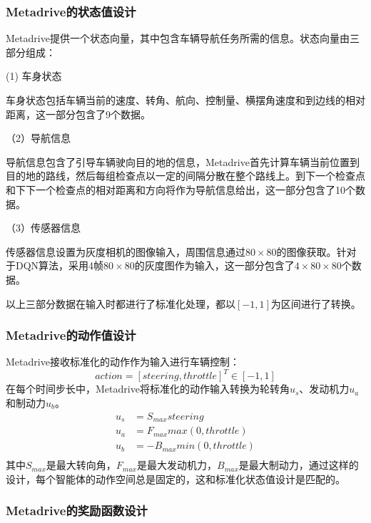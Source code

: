 \subsubsection{Metadrive的状态值设计}

Metadrive提供一个状态向量，其中包含车辆导航任务所需的信息。状态向量由三部分组成：

(1) 车身状态

车身状态包括车辆当前的速度、转角、航向、控制量、横摆角速度和到边线的相对距离，这一部分包含了9个数据。

（2）导航信息

导航信息包含了引导车辆驶向目的地的信息，Metadrive首先计算车辆当前位置到目的地的路线，然后每组检查点以一定的间隔分散在整个路线上。到下一个检查点和下下一个检查点的相对距离和方向将作为导航信息给出，这一部分包含了10个数据。

（3）传感器信息

传感器信息设置为灰度相机的图像输入，周围信息通过$80\times80$的图像获取。针对于DQN算法，采用4帧$80\times80$的灰度图作为输入，这一部分包含了$4\times80\times80$个数据。

以上三部分数据在输入时都进行了标准化处理，都以$[-1,1]$为区间进行了转换。

\subsubsection{Metadrive的动作值设计}

Metadrive接收标准化的动作作为输入进行车辆控制：
\begin{equation*}
    action = [steering, throttle]^{T} \in [-1,1]
\end{equation*}
在每个时间步长中，Metadrive将标准化的动作输入转换为轮转角$u_s$、发动机力$u_a$和制动力$u_b$。
\begin{equation*}
    \begin{aligned}
        u_s &= S_{max} steering\\
        u_a &= F_{max} max(0,throttle)\\
        u_b &= -B_{max} min(0,throttle)\\
    \end{aligned}
\end{equation*}
其中$S_{max}$是最大转向角，$F_{max}$是最大发动机力，$B_{max}$是最大制动力，通过这样的设计，每个智能体的动作空间总是固定的，这和标准化状态值设计是匹配的。

\subsubsection{Metadrive的奖励函数设计}

